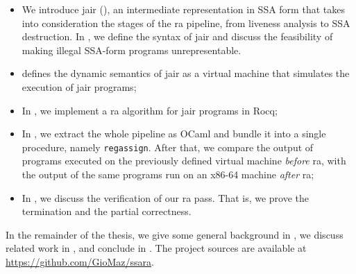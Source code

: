 \begin{itemize}
    \item We introduce \gls{jair} (), an intermediate representation in SSA form that takes into consideration the stages of the \gls{ra} pipeline, from liveness analysis to SSA destruction. In , we define the syntax of \gls{jair} and discuss the feasibility of making illegal SSA-form programs unrepresentable.

    \item {} defines the dynamic semantics of \gls{jair} as a virtual machine that simulates the execution of \gls{jair} programs;

    \item In , we implement a \gls{ra} algorithm for \gls{jair} programs in Rocq;

    \item In , we extract the whole pipeline as OCaml and bundle it into a single procedure, namely \texttt{regassign}. After that, we compare the output of programs executed on the previously defined virtual machine \textit{before} \gls{ra}, with the output of the same programs run on an x86-64 machine \textit{after} \gls{ra};

    \item In , we discuss the verification of our \gls{ra} pass. That is, we prove the termination and the partial correctness.
\end{itemize}

In the remainder of the thesis, we give some general background in , we discuss related work in , and conclude in .
The project sources are available at \url{https://github.com/GioMaz/ssara}.

